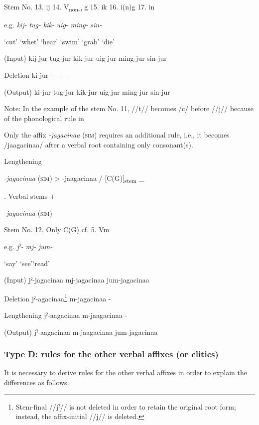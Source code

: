 \begin{table}
Stem No.  13. ij  14. V\textsubscript{non-}\textit{\textsubscript{i}} g  15. ik  16. i(n)g    17. in

e.g.  \textit{kij-}  \textit{tug-}  \textit{kik-}  \textit{uig-}  \textit{ming-}  \textit{sin-}

  ‘cut’  ‘whet’  ‘hear’  ‘swim’  ‘grab’  ‘die’

(Input)  kij-jur  tug-jur  kik-jur  uig-jur  ming-jur  sin-jur

Deletion  ki-jur  {}-  {}-  {}-  {}-  {}-

(Output)  ki-jur  tug-jur  kik-jur  uig-jur  ming-jur  sin-jur

Note: In the example of the stem No. 11, //t// becomes /c/ before //j// because of the phonological rule in 
\end{table}

Only the affix \textit{{}-jagacinaa} (\textsc{sim}) requires an additional rule, i.e., it becomes /jaagacinaa/ after a verbal root containing only consonant(s).

\ea\label{ex:8-15}
  Lengthening

  \textit{{}-jagacinaa} (\textsc{sim})  >  {}-jaagacinaa  /  [C(G)]\textsubscript{stem}  \_
\z

\begin{table}
\caption{\label{tab:key:63}. Verbal stems +} \textmd{\textit{{}-jagacinaa}}\textmd{ (\textsc{sim})}

Stem No.  12. Only C(G)    cf.  5. Vm

e.g.  \textit{jˀ-}  \textit{mj-}      \textit{jum-}

  ‘say’  ‘see’\glt ‘read’

(Input)  jˀ-jagacinaa  mj-jagacinaa      jum-jagacinaa

Deletion  jˀ-agacinaa\footnote{Stem-final //jˀ// is not deleted in order to retain the original root form; instead, the affix-initial //j// is deleted.}  m-jagacinaa      {}-

Lengthening  jˀ-aagacinaa  m-jaagacinaa      {}-

(Output)  jˀ-aagacinaa  m-jaagacinaa      jum-jagacinaa
\end{table}

\subsubsection{Type D: rules for the other verbal affixes (or clitics)}
\label{bkm:Ref347177096}
It is necessary to derive rules for the other verbal affixes in order to explain the differences as follows.

